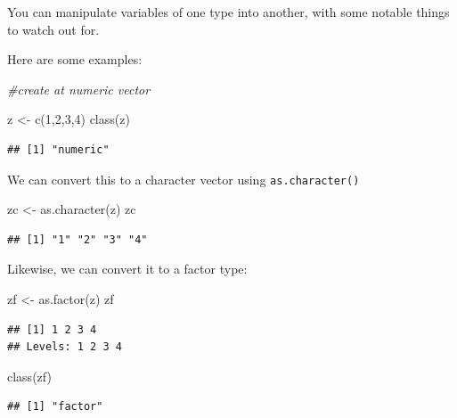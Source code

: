 \documentclass[
]{article}
\newenvironment{Shaded}{\begin{snugshade}}{\end{snugshade}}
\newcommand{\CommentTok}[1]{\textcolor[rgb]{0.56,0.35,0.01}{\textit{#1}}}
\newcommand{\DecValTok}[1]{\textcolor[rgb]{0.00,0.00,0.81}{#1}}
\newcommand{\FunctionTok}[1]{\textcolor[rgb]{0.00,0.00,0.00}{#1}}
\newcommand{\NormalTok}[1]{#1}
\newcommand{\OtherTok}[1]{\textcolor[rgb]{0.56,0.35,0.01}{#1}}
\begin{document}
You can manipulate variables of one type into another, with some notable
things to watch out for.

Here are some examples:

\begin{Shaded}
\begin{Highlighting}[]
\CommentTok{\#create at numeric vector}

\NormalTok{z }\OtherTok{\textless{}{-}}  \FunctionTok{c}\NormalTok{(}\DecValTok{1}\NormalTok{,}\DecValTok{2}\NormalTok{,}\DecValTok{3}\NormalTok{,}\DecValTok{4}\NormalTok{)}
\FunctionTok{class}\NormalTok{(z)}
\end{Highlighting}
\end{Shaded}

\begin{verbatim}
## [1] "numeric"
\end{verbatim}

We can convert this to a character vector using \texttt{as.character()}

\begin{Shaded}
\begin{Highlighting}[]
\NormalTok{zc }\OtherTok{\textless{}{-}}  \FunctionTok{as.character}\NormalTok{(z)}
\NormalTok{zc}
\end{Highlighting}
\end{Shaded}

\begin{verbatim}
## [1] "1" "2" "3" "4"
\end{verbatim}

Likewise, we can convert it to a factor type:

\begin{Shaded}
\begin{Highlighting}[]
\NormalTok{zf }\OtherTok{\textless{}{-}} \FunctionTok{as.factor}\NormalTok{(z)}
\NormalTok{zf}
\end{Highlighting}
\end{Shaded}

\begin{verbatim}
## [1] 1 2 3 4
## Levels: 1 2 3 4
\end{verbatim}

\begin{Shaded}
\begin{Highlighting}[]
\FunctionTok{class}\NormalTok{(zf)}
\end{Highlighting}
\end{Shaded}

\begin{verbatim}
## [1] "factor"
\end{verbatim}
\end{document}
